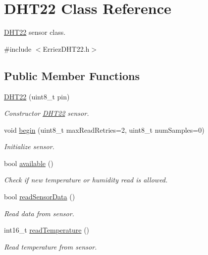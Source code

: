 \hypertarget{class_d_h_t22}{}\section{D\+H\+T22 Class Reference}
\label{class_d_h_t22}


\hyperlink{class_d_h_t22}{D\+H\+T22} sensor class.  




{\ttfamily \#include $<$Erriez\+D\+H\+T22.\+h$>$}

\subsection*{Public Member Functions}
\begin{DoxyCompactItemize}
\item 
\hyperlink{class_d_h_t22_a6983635331e939d679888b4a936e0f53}{D\+H\+T22} (uint8\+\_\+t pin)
\begin{DoxyCompactList}\small\item\em Constructor \hyperlink{class_d_h_t22}{D\+H\+T22} sensor. \end{DoxyCompactList}\item 
void \hyperlink{class_d_h_t22_ac33c0371f23ea0172934b5a04fc2dbfd}{begin} (uint8\+\_\+t max\+Read\+Retries=2, uint8\+\_\+t num\+Samples=0)
\begin{DoxyCompactList}\small\item\em Initialize sensor. \end{DoxyCompactList}\item 
bool \hyperlink{class_d_h_t22_a70b4c57d73f985e715bd523f15ccae25}{available} ()
\begin{DoxyCompactList}\small\item\em Check if new temperature or humidity read is allowed. \end{DoxyCompactList}\item 
bool \hyperlink{class_d_h_t22_ab01022d5617b70268fed481f64e560b9}{read\+Sensor\+Data} ()
\begin{DoxyCompactList}\small\item\em Read data from sensor. \end{DoxyCompactList}\item 
int16\+\_\+t \hyperlink{class_d_h_t22_aeed4f98e419ffb07d3e4c09ebc10162c}{read\+Temperature} ()
\begin{DoxyCompactList}\small\item\em Read temperature from sensor. \end{DoxyCompactList}\item 

\end{DoxyCompactItemize}
